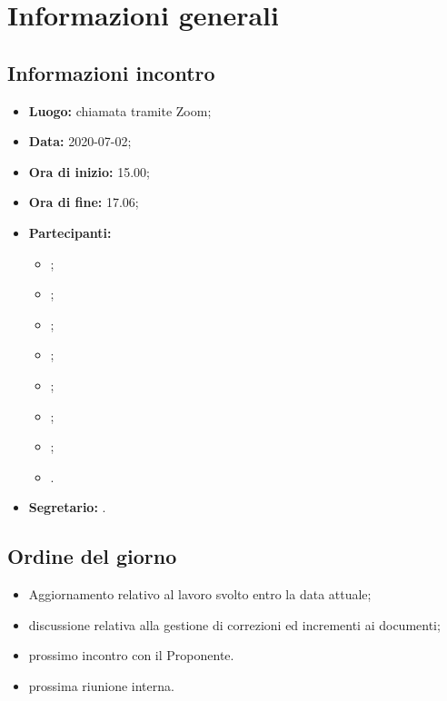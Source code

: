 \section{Informazioni generali}
\subsection{Informazioni incontro}
\begin{itemize}
	\item \textbf{Luogo:} chiamata tramite Zoom;
	\item \textbf{Data:} 2020-07-02;
	\item \textbf{Ora di inizio:} 15.00;
	\item \textbf{Ora di fine:} 17.06;
	\item \textbf{Partecipanti:}
		\begin{itemize}
			\item \VB;
			\item \LB;
			\item \NF;
			\item \EG;
			\item \FJ;
			\item \MP;
			\item \AS;
			\item \AZ.
		\end{itemize}
	\item \textbf{Segretario:} \AS.
\end{itemize}

\subsection{Ordine del giorno}
\begin{itemize}
	\item Aggiornamento relativo al lavoro svolto entro la data attuale;
	\item discussione relativa alla gestione di correzioni ed incrementi ai documenti;
	\item prossimo incontro con il Proponente.
	\item prossima riunione interna.
\end{itemize}

